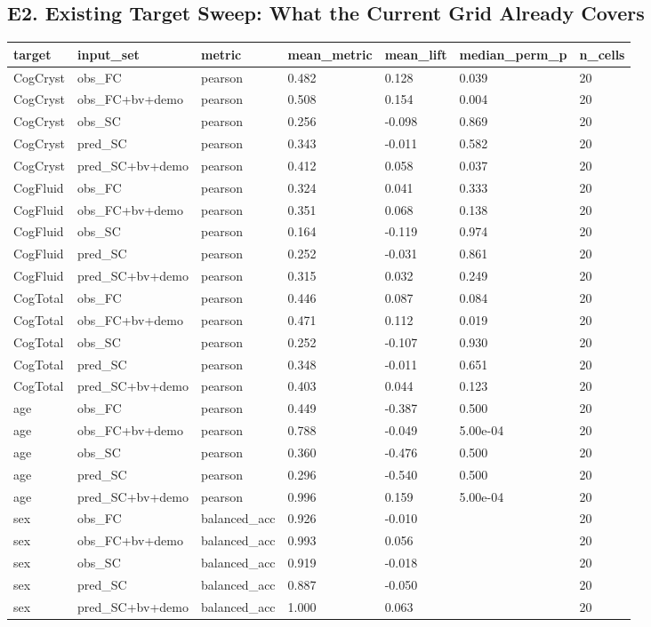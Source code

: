 \subsection{E2. Existing Target Sweep: What the Current Grid Already Covers}\label{e2-existing-target-sweep-what-the-current-grid-already-covers}

{\def\LTcaptype{none} %
\begin{longtable}[]{@{}lllllll@{}}
\toprule\noalign{}
target & input\_set & metric & mean\_metric & mean\_lift & median\_perm\_p & n\_cells \\
\midrule\noalign{}
\endhead
\bottomrule\noalign{}
\endlastfoot
CogCryst & obs\_FC & pearson & 0.482 & 0.128 & 0.039 & 20 \\
CogCryst & obs\_FC+bv+demo & pearson & 0.508 & 0.154 & 0.004 & 20 \\
CogCryst & obs\_SC & pearson & 0.256 & -0.098 & 0.869 & 20 \\
CogCryst & pred\_SC & pearson & 0.343 & -0.011 & 0.582 & 20 \\
CogCryst & pred\_SC+bv+demo & pearson & 0.412 & 0.058 & 0.037 & 20 \\
CogFluid & obs\_FC & pearson & 0.324 & 0.041 & 0.333 & 20 \\
CogFluid & obs\_FC+bv+demo & pearson & 0.351 & 0.068 & 0.138 & 20 \\
CogFluid & obs\_SC & pearson & 0.164 & -0.119 & 0.974 & 20 \\
CogFluid & pred\_SC & pearson & 0.252 & -0.031 & 0.861 & 20 \\
CogFluid & pred\_SC+bv+demo & pearson & 0.315 & 0.032 & 0.249 & 20 \\
CogTotal & obs\_FC & pearson & 0.446 & 0.087 & 0.084 & 20 \\
CogTotal & obs\_FC+bv+demo & pearson & 0.471 & 0.112 & 0.019 & 20 \\
CogTotal & obs\_SC & pearson & 0.252 & -0.107 & 0.930 & 20 \\
CogTotal & pred\_SC & pearson & 0.348 & -0.011 & 0.651 & 20 \\
CogTotal & pred\_SC+bv+demo & pearson & 0.403 & 0.044 & 0.123 & 20 \\
age & obs\_FC & pearson & 0.449 & -0.387 & 0.500 & 20 \\
age & obs\_FC+bv+demo & pearson & 0.788 & -0.049 & 5.00e-04 & 20 \\
age & obs\_SC & pearson & 0.360 & -0.476 & 0.500 & 20 \\
age & pred\_SC & pearson & 0.296 & -0.540 & 0.500 & 20 \\
age & pred\_SC+bv+demo & pearson & 0.996 & 0.159 & 5.00e-04 & 20 \\
sex & obs\_FC & balanced\_acc & 0.926 & -0.010 & & 20 \\
sex & obs\_FC+bv+demo & balanced\_acc & 0.993 & 0.056 & & 20 \\
sex & obs\_SC & balanced\_acc & 0.919 & -0.018 & & 20 \\
sex & pred\_SC & balanced\_acc & 0.887 & -0.050 & & 20 \\
sex & pred\_SC+bv+demo & balanced\_acc & 1.000 & 0.063 & & 20 \\
\end{longtable}
}

